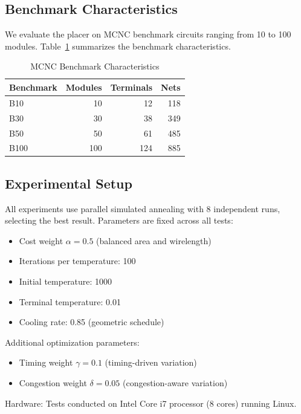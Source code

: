 \documentclass[11pt]{article}
\begin{document}
\subsection{Benchmark Characteristics}

We evaluate the placer on MCNC benchmark circuits ranging from 10 to 100 modules. Table~\ref{tab:benchmarks} summarizes the benchmark characteristics.

\begin{table}[H]
\centering
\caption{MCNC Benchmark Characteristics}
\label{tab:benchmarks}
\begin{tabular}{|l|r|r|r|}
\hline
\textbf{Benchmark} & \textbf{Modules} & \textbf{Terminals} & \textbf{Nets} \\
\hline
B10 & 10 & 12 & 118 \\
B30 & 30 & 38 & 349 \\
B50 & 50 & 61 & 485 \\
B100 & 100 & 124 & 885 \\
\hline
\end{tabular}
\end{table}

\subsection{Experimental Setup}

All experiments use parallel simulated annealing with 8 independent runs, selecting the best result. Parameters are fixed across all tests:
\begin{itemize}
    \item Cost weight $\alpha = 0.5$ (balanced area and wirelength)
    \item Iterations per temperature: 100
    \item Initial temperature: 1000
    \item Terminal temperature: 0.01
    \item Cooling rate: 0.85 (geometric schedule)
\end{itemize}

Additional optimization parameters:
\begin{itemize}
    \item Timing weight $\gamma = 0.1$ (timing-driven variation)
    \item Congestion weight $\delta = 0.05$ (congestion-aware variation)
\end{itemize}

Hardware: Tests conducted on Intel Core i7 processor (8 cores) running Linux.
\end{document}
